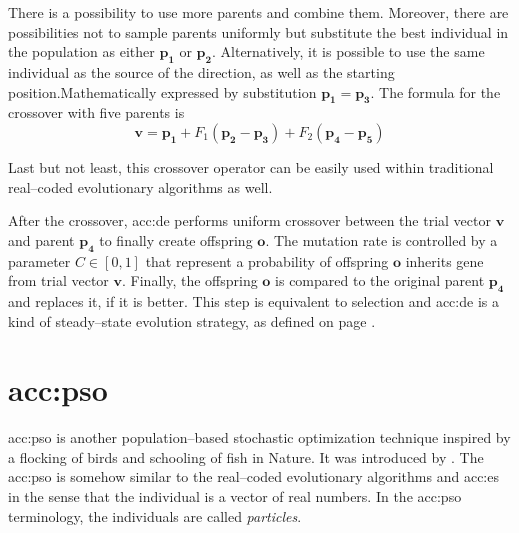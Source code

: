There is a possibility to use more parents and combine them. Moreover, there are possibilities not to sample parents uniformly but substitute the best individual in the population as either $\mathbf{p_1}$ or $\mathbf{p_2}$. Alternatively, it is possible to use the same individual as the source of the direction, as well as the starting position.Mathematically expressed by substitution $\mathbf{p_1} = \mathbf{p_3}$. The formula for the crossover with five parents is
$$
\mathbf{v} = \mathbf{p_1} + F_1\left( \mathbf{p_2} - \mathbf{p_3} \right) + F_2\left( \mathbf{p_4} - \mathbf{p_5} \right)
$$

Last but not least, this crossover operator can be easily used within traditional real--coded evolutionary algorithms as well.

After the crossover, \acrshort{acc:de} performs uniform crossover between the trial vector $\mathbf{v}$ and parent $\mathbf{p_4}$ to finally create offspring $\mathbf{o}$. The mutation rate is controlled by a parameter $C\in\left[0,1\right]$ that represent a probability of offspring $\mathbf{o}$ inherits gene from trial vector $\mathbf{v}$. Finally, the offspring $\mathbf{o}$ is compared to the original parent $\mathbf{p_4}$ and replaces it, if it is better. This step is equivalent to selection and \acrshort{acc:de} is a kind of steady--state evolution strategy, as defined on page \pageref{enum:steadystate}.




\section{\texorpdfstring{\acrlong*{acc:pso}}{Particle Swarm Optimization}}

\acrfull{acc:pso} is another population--based stochastic optimization technique inspired by a flocking of birds and schooling of fish in Nature. It was introduced by \citet*{PSOOriginal}. The \acrshort{acc:pso} is somehow similar to the real--coded evolutionary algorithms and \acrshort{acc:es} in the sense that the individual is a vector of real numbers. In the \acrshort{acc:pso} terminology, the individuals are called \emph{particles}.

